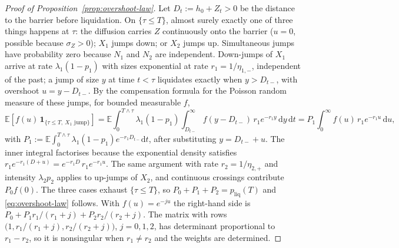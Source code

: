 \documentclass[11pt]{article}
\newcommand{\E}{\mathbb{E}}
\newcommand{\diff}{\mathrm{d}}
\newcommand{\one}{\mathbf{1}}
\theoremstyle{plain}
\theoremstyle{definition}
\theoremstyle{remark}
\begin{document}
\begin{proof}[Proof of Proposition~\ref{prop:overshoot-law}]\label{proof:prop:overshoot-law}
Let $D_t:=h_0+Z_t>0$ be the distance to the barrier before liquidation. On $\{\tau\le T\}$, almost
surely exactly one of three things happens at $\tau$: the diffusion carries $Z$ continuously onto the
barrier ($u=0$, possible because $\sigma_Z>0$); $X_1$ jumps down; or $X_2$ jumps up. Simultaneous
jumps have probability zero because $N_1$ and $N_2$ are independent. Down-jumps of $X_1$ arrive at
rate $\lambda_1(1-p_1)$ with sizes exponential at rate $r_1=1/\eta_{1,-}$, independent of the past; a
jump of size $y$ at time $t<\tau$ liquidates exactly when $y>D_{t-}$, with overshoot $u=y-D_{t-}$. By
the compensation formula for the Poisson random measure of these jumps, for bounded measurable $f$,
\[
\E\!\left[f(u)\,\one_{\{\tau\le T,\ X_1\text{ jump}\}}\right]
=\E\!\int_0^{T\wedge\tau}\!\lambda_1(1-p_1)\int_{D_{t-}}^{\infty}f(y-D_{t-})\,r_1e^{-r_1y}\,\diff y\,\diff t
=P_1\int_0^\infty f(u)\,r_1e^{-r_1u}\,\diff u ,
\]
with $P_1:=\E\int_0^{T\wedge\tau}\lambda_1(1-p_1)e^{-r_1D_{t-}}\diff t$, after substituting
$y=D_{t-}+u$. The inner integral factorises because the exponential density satisfies
$r_1e^{-r_1(D+u)}=e^{-r_1D}\,r_1e^{-r_1u}$. The same argument with rate $r_2=1/\eta_{2,+}$ and
intensity $\lambda_2p_2$ applies to up-jumps of $X_2$, and continuous crossings contribute
$P_0f(0)$. The three cases exhaust $\{\tau\le T\}$, so $P_0+P_1+P_2=p_{\mathrm{liq}}(T)$ and
\eqref{eq:overshoot-law} follows. With $f(u)=e^{-ju}$ the right-hand side is
$P_0+P_1r_1/(r_1+j)+P_2r_2/(r_2+j)$. The matrix with rows $\bigl(1,r_1/(r_1+j),r_2/(r_2+j)\bigr)$,
$j=0,1,2$, has determinant proportional to $r_1-r_2$, so it is nonsingular when $r_1\neq r_2$ and the
weights are determined.
\end{proof}

\end{document}
